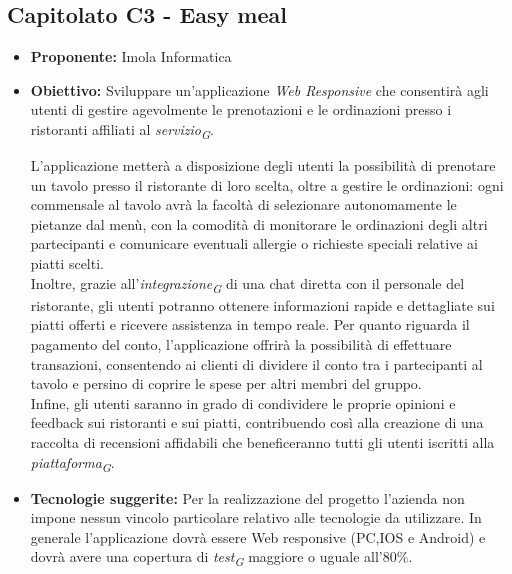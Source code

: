 \documentclass{article}
\begin{document}
\subsection{\textbf{Capitolato C3} - Easy meal}
\begin{itemize}
    \item[] \textbf{Proponente:} Imola Informatica
    
    \item[] \textbf{Obiettivo:} Sviluppare un’applicazione \textit{Web Responsive} che consentirà agli utenti di gestire agevolmente le prenotazioni e le ordinazioni presso i ristoranti affiliati al \textit{servizio}\textsubscript{\textit{G}}.
    
    L'applicazione metterà a disposizione degli utenti la possibilità di prenotare un tavolo presso il ristorante di loro scelta, oltre a gestire le ordinazioni: ogni commensale al tavolo avrà la facoltà di selezionare autonomamente le pietanze dal menù, con la comodità di monitorare le ordinazioni degli altri partecipanti e comunicare eventuali allergie o richieste speciali relative ai piatti scelti. \\
    Inoltre, grazie all'\textit{integrazione}\textsubscript{\textit{G}} di una chat diretta con il personale del ristorante, gli utenti potranno ottenere informazioni rapide e dettagliate sui piatti offerti e ricevere assistenza in tempo reale.
    Per quanto riguarda il pagamento del conto, l'applicazione offrirà la possibilità di effettuare transazioni, consentendo ai clienti di dividere il conto tra i partecipanti al tavolo e persino di coprire le spese per altri membri del gruppo. \\
    Infine, gli utenti saranno in grado di condividere le proprie opinioni e feedback sui ristoranti e sui piatti, contribuendo così alla creazione di una raccolta di recensioni affidabili che beneficeranno tutti gli utenti iscritti alla \textit{piattaforma}\textsubscript{\textit{G}}.
    
    \item[] \textbf{Tecnologie suggerite:} Per la realizzazione del progetto l’azienda non impone nessun vincolo particolare relativo alle tecnologie da utilizzare. In generale l’applicazione dovrà essere Web responsive (PC,IOS e Android) e dovrà avere una copertura di \textit{test}\textsubscript{\textit{G}} maggiore o uguale all’80\%.


\end{itemize}
\end{document}
